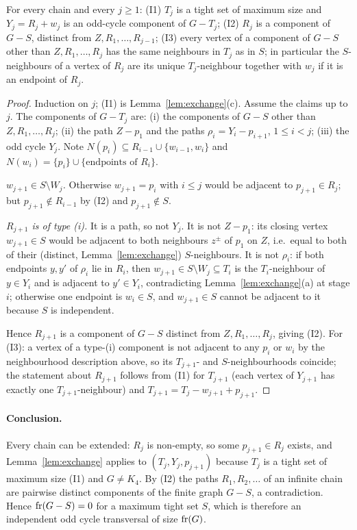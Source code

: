 \begin{lemma}\label{lem:chain}
For every chain and every $j\ge1$:
(I1) $T_j$ is a tight set of maximum size and $Y_j=R_j+w_j$ is an odd-cycle component of $G-T_j$;
(I2) $R_j$ is a component of $G-S$, distinct from $Z,R_1,\dots,R_{j-1}$;
(I3) every vertex of a component of $G-S$ other than $Z,R_1,\dots,R_j$ has the same neighbours
in $T_j$ as in $S$; in particular the $S$-neighbours of a vertex of $R_j$ are its unique
$T_j$-neighbour together with $w_j$ if it is an endpoint of $R_j$.
\end{lemma}
\begin{proof}
Induction on $j$; (I1) is Lemma~\ref{lem:exchange}(c). Assume the claims up to $j$. The components
of $G-T_j$ are: (i) the components of $G-S$ other than $Z,R_1,\dots,R_j$; (ii) the path $Z-p_1$
and the paths $\rho_i=Y_i-p_{i+1}$, $1\le i<j$; (iii) the odd cycle $Y_j$.
Note $N(p_i)\subseteq R_{i-1}\cup\{w_{i-1},w_i\}$ and $N(w_i)=\{p_i\}\cup\{\text{endpoints of }R_i\}$.

\emph{$w_{j+1}\in S\setminus W_j$.} Otherwise $w_{j+1}=p_i$ with $i\le j$ would be adjacent to
$p_{j+1}\in R_j$; but $p_{j+1}\notin R_{i-1}$ by (I2) and $p_{j+1}\notin S$.

\emph{$R_{j+1}$ is of type (i).} It is a path, so not $Y_j$. It is not $Z-p_1$: its closing vertex
$w_{j+1}\in S$ would be adjacent to both neighbours $z^\pm$ of $p_1$ on $Z$, i.e.\ equal to both
of their (distinct, Lemma~\ref{lem:exchange}) $S$-neighbours. It is not $\rho_i$: if both endpoints
$y,y'$ of $\rho_i$ lie in $R_i$, then $w_{j+1}\in S\setminus W_j\subseteq T_i$ is the
$T_i$-neighbour of $y\in Y_i$ and is adjacent to $y'\in Y_i$, contradicting
Lemma~\ref{lem:exchange}(a) at stage $i$; otherwise one endpoint is $w_i\in S$, and $w_{j+1}\in S$
cannot be adjacent to it because $S$ is independent.

Hence $R_{j+1}$ is a component of $G-S$ distinct from $Z,R_1,\dots,R_j$, giving (I2). For (I3):
a vertex of a type-(i) component is not adjacent to any $p_i$ or $w_i$ by the neighbourhood
description above, so its $T_{j+1}$- and $S$-neighbourhoods coincide; the statement about $R_{j+1}$
follows from (I1) for $T_{j+1}$ (each vertex of $Y_{j+1}$ has exactly one $T_{j+1}$-neighbour) and
$T_{j+1}=T_j-w_{j+1}+p_{j+1}$.
\end{proof}

\paragraph*{Conclusion.}
Every chain can be extended: $R_j$ is non-empty, so some $p_{j+1}\in R_j$ exists, and
Lemma~\ref{lem:exchange} applies to $(T_j,Y_j,p_{j+1})$ because $T_j$ is a tight set of maximum
size (I1) and $G\ne K_4$. By (I2) the paths $R_1,R_2,\dots$ of an infinite chain are pairwise
distinct components of the finite graph $G-S$, a contradiction. Hence $\operatorname{fr}(G-S)=0$ for a maximum
tight set $S$, which is therefore an independent odd cycle transversal of size $\operatorname{fr}(G)$.

